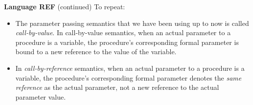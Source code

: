 \begin{minipage}[t]{\sw}
\slidenumber
\LARGE
{\bf Language REF} (continued)\exx
To repeat:
\begin{itemize}
\item
  The parameter passing semantics
  that we have been using up to now
  is called {\em call-by-value}.
  In call-by-value semantics,
  when an actual parameter to a procedure is a variable,
  the procedure's corresponding formal parameter is bound
  to a new reference to the value of the variable.
\item
  In {\em call-by-reference} semantics,
  when an actual parameter to a procedure is a variable,
  the procedure's corresponding formal parameter denotes
  the {\em same reference} as the actual parameter,
  not a new reference to the actual parameter value.
\end{itemize}
\end{minipage}
